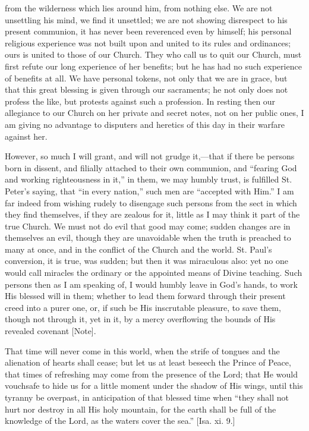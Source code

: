 from the wilderness which lies around him, from nothing else. We are
not unsettling his mind, we find it unsettled; we are not showing
disrespect to his present communion, it has never been reverenced even
by himself; his personal religious experience was not built upon and
united to its rules and ordinances; ours is united to those of our
Church. They who call us to quit our Church, must first refute our
long experience of her benefits; but he has had no such experience of
benefits at all. We have personal tokens, not only that we are in
grace, but that this great blessing is given through our sacraments;
he not only does not profess the like, but protests against such a
profession. In resting then our allegiance to our Church on her
private and secret notes, not on her public ones, I am giving no
advantage to disputers and heretics of this day in their warfare
against her.

However, so much I will grant, and will not grudge it,—that if
there be persons born in dissent, and filially attached to their own
communion, and ``fearing God and working righteousness in
it,'' in them, we may humbly trust, is fulfilled St. Peter's
saying, that ``in every nation,'' such men are ``accepted
with Him.'' I am far indeed from wishing rudely to disengage such
persons from the sect in which they find themselves, if they are
zealous for it, little as I may think it part of the true Church. We
must not do evil that good may come; sudden changes are in themselves
an evil, though they are unavoidable when the truth is preached to
many at once, and in the conflict of the Church and the world. St.
Paul's conversion, it is true, was sudden; but then it was miraculous
also: yet no one would call miracles the ordinary or the appointed
means of Divine teaching. Such persons then as I am speaking of, I
would humbly leave in God's hands, to work His blessed will in them;
whether to lead them forward through their present creed into a purer
one, or, if such be His inscrutable pleasure, to save them, though not
through it, yet in it, by a mercy overflowing the bounds of His
revealed covenant [Note].

That time will never come in this world, when the strife of tongues
and the alienation of hearts shall cease; but let us at least beseech
the Prince of Peace, that times of refreshing may come from the
presence of the Lord; that He would vouchsafe to hide us for a little
moment under the shadow of His wings, until this tyranny be overpast,
in anticipation of that blessed time when ``they shall not hurt
nor destroy in all His holy mountain, for the earth shall be full of
the knowledge of the Lord, as the waters cover the sea.'' [Isa. xi.
9.]

